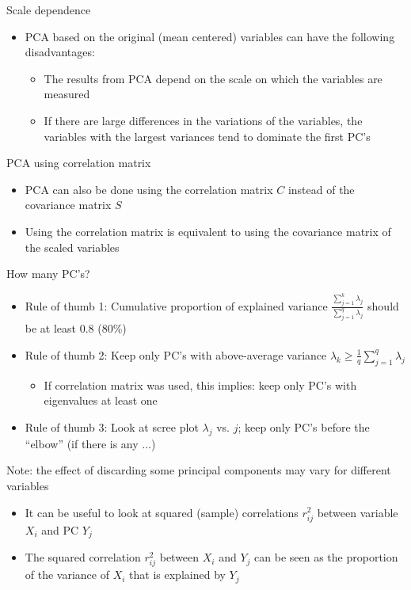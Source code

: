 \documentclass[a4paper]{article}
\begin{document}
Scale dependence
\begin{itemize}
    \item PCA based on the original (mean centered) variables can have the following disadvantages:
    \begin{itemize}
        \item The results from PCA depend on the scale on which the variables are measured
        \item If there are large differences in the variations of the variables, the variables with the largest variances tend to dominate the first PC's
    \end{itemize}
\end{itemize}

PCA using correlation matrix
\begin{itemize}
    \item PCA can also be done using the correlation matrix $C$ instead of the covariance matrix $S$
    \item Using the correlation matrix is equivalent to using the covariance matrix of the scaled variables
\end{itemize}

How many PC's?
\begin{itemize}
    \item Rule of thumb 1: Cumulative proportion of explained variance $\frac{\sum_{j=1}^{k}\lambda_j}{\sum_{j=1}^{q}\lambda_j}$ should be at least 0.8 (80\%)
    \item Rule of thumb 2: Keep only PC's with above-average variance $\lambda_k\geq\frac{1}{q}\sum_{j=1}^{q}\lambda_j$
    \begin{itemize}
        \item If correlation matrix was used, this implies: keep only PC's with eigenvalues at least one
    \end{itemize}
    \item Rule of thumb 3: Look at scree plot $\lambda_j$ vs. $j$; keep only PC's before the ``elbow'' (if there is any ...)
\end{itemize}

Note: the effect of discarding some principal components may vary for different variables
\begin{itemize}
    \item It can be useful to look at squared (sample) correlations $r_{ij}^2$ between variable $X_i$ and PC $Y_j$
    \item The squared correlation $r_{ij}^2$ between $X_i$ and $Y_j$ can be seen as the proportion of the variance of $X_i$ that is explained by $Y_j$
\end{itemize}
\end{document}
